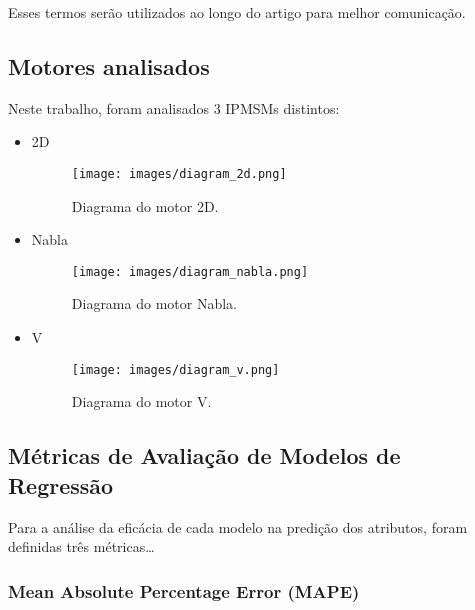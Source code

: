 \documentclass{article}
\begin{document}
\noindent Esses termos serão utilizados ao longo do artigo para melhor comunicação.


\newpage


\subsection{Motores analisados}

\noindent Neste trabalho, foram analisados 3 IPMSMs distintos:

\begin{itemize}
    \item 2D
    \\
        \begin{figure}[htbp]
            \centering
            \texttt{[image: images/diagram\_2d.png]}
            \caption{Diagrama do motor 2D.}
            \label{fig:diagram_2d}
        \end{figure}
    \item Nabla
    \\
        \begin{figure}[htbp]
            \centering
            \texttt{[image: images/diagram\_nabla.png]}
            \caption{Diagrama do motor Nabla.}
            \label{fig:diagram_nabla}
        \end{figure}
    \item V
    \\
        \begin{figure}[htbp]
            \centering
            \texttt{[image: images/diagram\_v.png]}
            \caption{Diagrama do motor V.}
            \label{fig:diagram_v}
        \end{figure}
\end{itemize}


\newpage


\subsection{Métricas de Avaliação de Modelos de Regressão}

Para a análise da eficácia de cada modelo na predição dos atributos, foram definidas três métricas\dots

\subsubsection{Mean Absolute Percentage Error (MAPE)}
\end{document}
